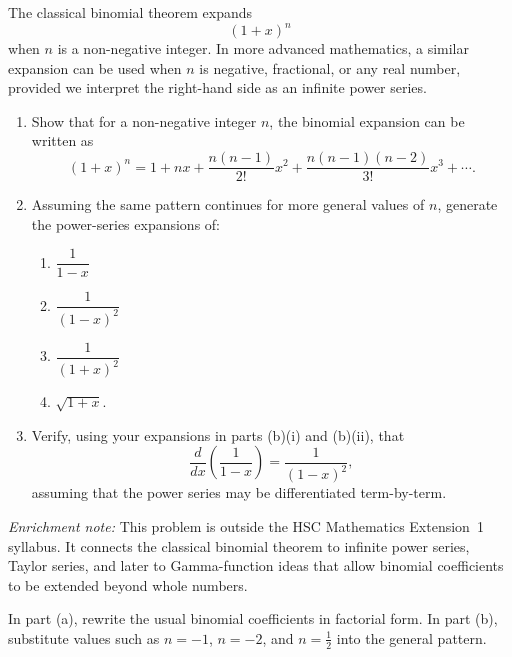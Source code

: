 \begin{problem}
The classical binomial theorem expands
\[
(1+x)^n
\]
when $n$ is a non-negative integer. In more advanced mathematics, a similar expansion can be used when $n$ is negative, fractional, or any real number, provided we interpret the right-hand side as an infinite power series.

\begin{enumerate}[label=\alph*)]
\item Show that for a non-negative integer $n$, the binomial expansion can be written as
\[
(1+x)^n
=
1+nx+\frac{n(n-1)}{2!}x^2+\frac{n(n-1)(n-2)}{3!}x^3+\cdots.
\]

\item Assuming the same pattern continues for more general values of $n$, generate the power-series expansions of:
\begin{enumerate}[label=\roman*)]
\item $\dfrac{1}{1-x}$
\item $\dfrac{1}{(1-x)^2}$
\item $\dfrac{1}{(1+x)^2}$
\item $\sqrt{1+x}$.
\end{enumerate}

\item Verify, using your expansions in parts (b)(i) and (b)(ii), that
\[
\frac{d}{dx}\left(\frac{1}{1-x}\right)=\frac{1}{(1-x)^2},
\]
assuming that the power series may be differentiated term-by-term.
\end{enumerate}

\noindent\textit{Enrichment note:} This problem is outside the HSC Mathematics Extension~1 syllabus. It connects the classical binomial theorem to infinite power series, Taylor series, and later to Gamma-function ideas that allow binomial coefficients to be extended beyond whole numbers.
\end{problem}

\begin{hint}
In part (a), rewrite the usual binomial coefficients in factorial form. In part (b), substitute values such as $n=-1$, $n=-2$, and $n=\tfrac12$ into the general pattern.
\end{hint}

